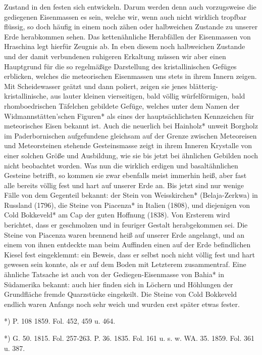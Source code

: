 \documentclass[a4paper, 8pt, oneside, polutonikogreek, german]{article}
\begin{document}
Zustand in den festen sich entwickeln. Darum werden denn auch vorzugsweise die gediegenen Eisenmassen es sein, welche wir, wenn auch nicht wirklich tropfbar flüssig, so doch häufig in einem noch zähen oder halbweichen Zustande zu unserer Erde herabkommen sehen. Das kettenähnliche Herabfällen der Eisenmassen von Hraschina legt hierfür Zeugnis ab. In eben diesem noch halbweichen Zustande und der damit verbundenen ruhigeren Erkaltung müssen wir aber einen Hauptgrund für die so regelmäßige Darstellung des kristallinischen Gefüges erblicken, welches die meteorischen Eisenmassen uns stets in ihrem Innern zeigen. Mit Scheidewasser geätzt und dann poliert, zeigen sie jenes blätterig-kristallinische, aus lauter kleinen vierseitigen, bald völlig würfelförmigen, bald rhomboedrischen Täfelchen gebildete Gefüge, welches unter dem Namen der Widmannstätten'schen Figuren* als eines der hauptsächlichsten Kennzeichen für meteorisches Eisen bekannt ist. Auch die neuerlich bei Hainholz* unweit Borgholz im Paderbornischen aufgefundene gleichsam auf der Grenze zwischen Meteoreisen und Meteorsteinen stehende Gesteinsmasse zeigt in ihrem Inneren Krystalle von einer solchen Größe und Ausbildung, wie sie bis jetzt bei ähnlichen Gebilden noch nicht beobachtet worden. Was nun die wirklich erdigen und basaltähnlichen Gesteine betrifft, so kommen sie zwar ebenfalls meist immerhin heiß, aber fast alle bereits völlig fest und hart auf unserer Erde an. Bis jetzt sind nur wenige Fälle von dem Gegenteil bekannt: der Stein von Weisskirchen* (Belaja-Zerkwa) in Russland (1796), die Steine von Piacenza* in Italien (1808), und diejenigen von Cold Bokkeveld* am Cap der guten Hoffnung (1838). Von Ersterem wird berichtet, dass er geschmolzen und in feuriger Gestalt herabgekommen sei. Die Steine von Piacenza waren brennend heiß auf unserer Erde angelangt, und an einem von ihnen entdeckte man beim Auffinden einen auf der Erde befindlichen Kiesel fest eingeklemmt: ein Beweis, dass er selbst noch nicht völlig fest und hart gewesen sein konnte, als er auf dem Boden mit Letzterem zusammentraf. Eine ähnliche Tatsache ist auch von der Gediegen-Eisenmasse von Bahia* in Südamerika bekannt: auch hier finden sich in Löchern und Höhlungen der Grundfläche fremde Quarzstücke eingekeilt. Die Steine von Cold Bokkeveld endlich waren Anfangs noch sehr weich und wurden erst später etwas fester.

*) P. 108 1859. Fol. 452, 459 u. 464.

*) G. 50. 1815. Fol. 257-263. P. 36. 1835. Fol. 161 u. s. w. WA. 35. 1859. Fol. 361 u. 387.
\end{document}
